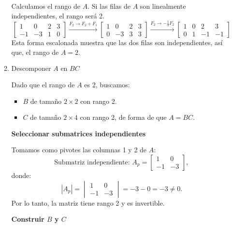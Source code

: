 \begin{enumerate}[label=\color{red}\textbf{\arabic*)}]
\begin{enumerate}[label=Paso \arabic*:]
            Calculamos el rango de  $A$. Si las filas de  $A$ son linealmente independientes, el rango será 2. \[
            \begin{bmatrix} 
            1 & 0 & 2 & 3\\
            -1 & -3 & 1 & 0
        \end{bmatrix}\xrightarrow{F_2\to F_2+F_1}\begin{bmatrix} 
            1 & 0 & 2 & 3\\
            0 & -3 & 3 & 3
        \end{bmatrix} \xrightarrow{F_2\to -\frac{1}{3} F_2}\begin{bmatrix} 
            1 & 0 & 2 & 3\\
            0 & 1 & -1 & -1
        \end{bmatrix}  
            \] 
            Esta forma escalonada muestra que las dos filas son independientes, así que, el rango de $A=2$.
        \item Descomponer  $A$ en $BC$

            Dado que el rango de  $A$ es 2, buscamos:
            \begin{itemize}[label=\textbullet]
                \item $B$ de tamaño  $2\times 2$ con rango 2.
                \item $C$ de tamaño  $2\times 4$ con rango 2, de forma de que $A=BC$.
            \end{itemize}
            \textbf{Seleccionar submatrices independientes}

            Tomamos como pivotes las columnas 1 y 2 de $A$:  \[
            \text{Submatriz independiente: }A_p=\begin{bmatrix} 
                1 & 0\\
                -1 & -3
            \end{bmatrix} ,
            \] donde: \[
            |A_p|=\begin{vmatrix} 
                1 & 0\\
                -1 & -3
            \end{vmatrix} =-3-0=-3\neq 0.
            \] 
            Por lo tanto, la matriz tiene rango 2 y es invertible.

            \textbf{Construir $B$ y $C$}


\end{enumerate}
\end{enumerate}

